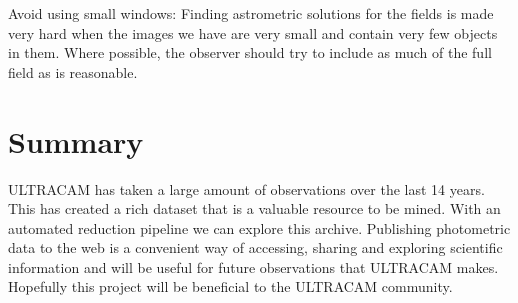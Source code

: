 {Avoid using small windows}: Finding astrometric solutions for the fields is made very hard when the images we have are very small and contain very few objects in them. Where possible, the observer should try to include as much of the full field as is reasonable. 

\section{Summary}
ULTRACAM has taken a large amount of observations over the last 14 years. This has created a rich dataset that is a valuable resource to be mined. With an automated reduction pipeline we can explore this archive. Publishing photometric data to the web is a convenient way of accessing, sharing and exploring scientific information and will be useful for future observations that ULTRACAM makes. Hopefully this project will be beneficial to the ULTRACAM community. 